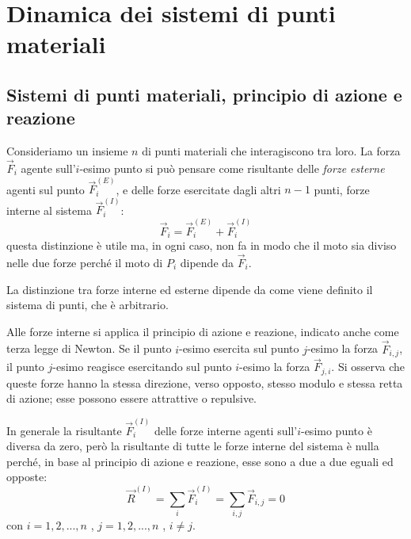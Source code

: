 \documentclass[class=book, crop=false, oneside, 12pt]{standalone}
\begin{document}
\chapter{Dinamica dei sistemi di punti materiali}

\section{Sistemi di punti materiali, principio di azione e reazione}

Consideriamo un insieme \(n\) di punti materiali che interagiscono tra loro.\newline
La forza \(\overrightarrow{F}_i\) agente sull'\(i\)-esimo punto si può pensare come risultante delle \emph{forze esterne}
agenti sul punto \(\overrightarrow{F}_i^{(E)}\), e delle forze esercitate dagli altri \(n-1\) punti, forze interne al sistema \(\overrightarrow{F}_i^{(I)}\):
\begin{equation} \label{forze_interne_esterne}
    \overrightarrow{F}_i = \overrightarrow{F}_i^{(E)} + \overrightarrow{F}_i^{(I)}
\end{equation}
questa distinzione è utile ma, in ogni caso, non fa in modo che il moto sia diviso nelle due forze perché il moto di \(P_i\) dipende da \(\overrightarrow{F}_i\).

La distinzione tra forze interne ed esterne dipende da come viene definito il sistema di punti, che è arbitrario.

Alle forze interne si applica il principio di azione e reazione, indicato anche come terza legge di Newton. 
Se il punto \(i\)-esimo esercita sul punto \(j\)-esimo la forza \(\overrightarrow{F}_{i,j}\), il punto \(j\)-esimo reagisce esercitando sul punto \(i\)-esimo la forza \(\overrightarrow{F}_{j,i}\).
Si osserva che queste forze hanno la stessa direzione, verso opposto, stesso modulo e stessa retta di azione; esse possono essere attrattive o repulsive. 

In generale la risultante \(\overrightarrow{F}_i^{(I)}\) delle forze interne agenti sull'\(i\)-esimo punto è diversa da zero, però la risultante di tutte le forze interne del sistema è nulla perché, in base al principio di azione e reazione, esse sono a due a due eguali ed opposte:
\begin{equation}
    \overrightarrow{R}^{(I)} = \sum_i \overrightarrow{F}_i^{(I)} = \sum_{i,j} \overrightarrow{F}_{i,j} = 0 
\end{equation}
con \(i  = 1,2,...,n\) , \(j = 1,2,...,n\) , \(i \neq j\).
\end{document}
